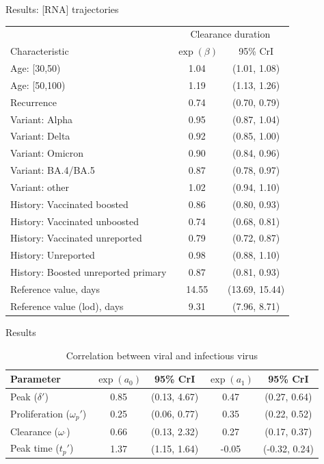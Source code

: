 \documentclass[9pt, aspectratio=169]{beamer}
\begin{document}
\begin{frame}{Results: [RNA] trajectories}
   \begin{table}[]
       \centering
       \begin{tabular}{lcc}
        \toprule
        & \multicolumn{2}{c}{Clearance duration} \\
        Characteristic & $\exp(\beta)$ & 95\% CrI\\
        \midrule
        Age: [30,50) & 1.04 & (1.01, 1.08)\\
        Age: [50,100) & 1.19 & (1.13, 1.26)\\
        Recurrence & 0.74 & (0.70, 0.79)\\
        Variant: Alpha & 0.95 & (0.87, 1.04)\\
        Variant: Delta & 0.92 & (0.85, 1.00)\\
        Variant: Omicron & 0.90 & (0.84, 0.96)\\
        Variant: BA.4/BA.5 & 0.87 & (0.78, 0.97)\\
        Variant: other & 1.02 & (0.94, 1.10)\\
        History: Vaccinated boosted & 0.86 & (0.80, 0.93)\\
        History: Vaccinated unboosted & 0.74 & (0.68, 0.81)\\
        History: Vaccinated unreported & 0.79 & (0.72, 0.87)\\
        History: Unreported & 0.98 & (0.88, 1.10)\\
        History: Boosted unreported primary & 0.87 & (0.81, 0.93)\\
        \midrule
        Reference value, days & 14.55 & (13.69, 15.44)\\
        Reference value (lod), days & 9.31 & (7.96, 8.71)\\
        \bottomrule
        \end{tabular}
   \end{table}
\end{frame}

\begin{frame}{Results}
   \begin{table}[]
       \centering
       \caption{Correlation between viral and infectious virus}
       \begin{tabular}{lcccc}
        \toprule
        Parameter & $\exp(a_0)$ & 95\% CrI & $\exp(a_1)$ & 95\% CrI\\
        \midrule
        Peak ($\delta'$) & 0.85 & (0.13, 4.67) & 0.47 & (0.27, 0.64) \\
        Proliferation ($\omega_p'$) & 0.25 & (0.06, 0.77) & 0.35 & (0.22, 0.52) \\
        Clearance ($\omega_^'$) & 0.66 & (0.13, 2.32) &  0.27 & (0.17, 0.37) \\
        \midrule
        Peak time ($t_p'$) & 1.37 & (1.15, 1.64) & -0.05 & (-0.32, 0.24)\\
        \bottomrule
        \end{tabular}
       \label{tab:corr}
   \end{table}
\end{frame}
\end{document}
